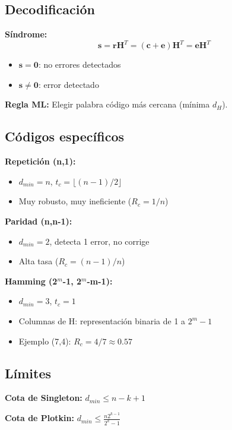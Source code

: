 \documentclass[10pt,a4paper]{article}
\begin{document}
\subsection{Decodificación}

\textbf{Síndrome:}
$$\mathbf{s} = \mathbf{r}\mathbf{H}^T = (\mathbf{c} + \mathbf{e})\mathbf{H}^T = \mathbf{e}\mathbf{H}^T$$

\begin{itemize}
\item $\mathbf{s} = \mathbf{0}$: no errores detectados
\item $\mathbf{s} \neq \mathbf{0}$: error detectado
\end{itemize}

\textbf{Regla ML:} Elegir palabra código más cercana (mínima $d_H$).

\subsection{Códigos específicos}

\textbf{Repetición (n,1):}
\begin{itemize}
\item $d_{min} = n$, $t_c = \lfloor (n-1)/2 \rfloor$
\item Muy robusto, muy ineficiente ($R_c = 1/n$)
\end{itemize}

\textbf{Paridad (n,n-1):}
\begin{itemize}
\item $d_{min} = 2$, detecta 1 error, no corrige
\item Alta tasa ($R_c = (n-1)/n$)
\end{itemize}

\textbf{Hamming (2$^m$-1, 2$^m$-m-1):}
\begin{itemize}
\item $d_{min} = 3$, $t_c = 1$
\item Columnas de H: representación binaria de 1 a $2^m-1$
\item Ejemplo (7,4): $R_c = 4/7 \approx 0.57$
\end{itemize}

\subsection{Límites}

\textbf{Cota de Singleton:} $d_{min} \leq n - k + 1$

\textbf{Cota de Plotkin:} $d_{min} \leq \frac{n2^{k-1}}{2^k-1}$
\end{document}
